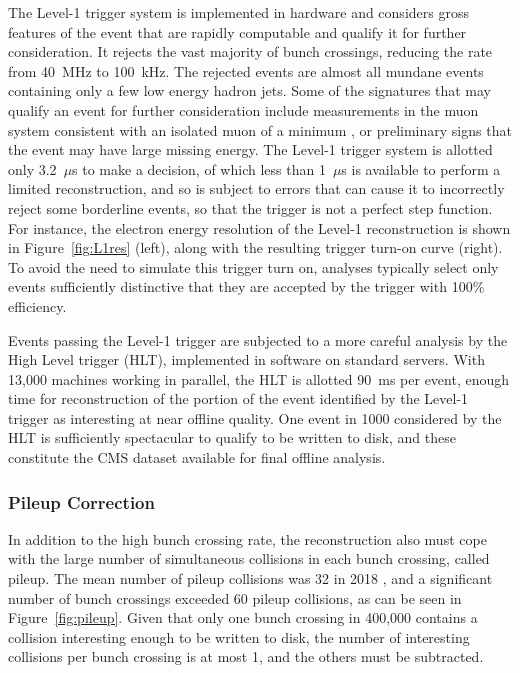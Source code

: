     The Level-1 trigger system is implemented in hardware and considers gross features of the event that are rapidly computable and qualify it for further consideration.
    It rejects the vast majority of bunch crossings, reducing the rate from 40~MHz to 100~kHz.
    The rejected events are almost all mundane events containing only a few low energy hadron jets.
    Some of the signatures that may qualify an event for further consideration include measurements in the muon system consistent with an isolated muon of a minimum \pt, or preliminary signs that the event may have large missing energy.
    The Level-1 trigger system is allotted only 3.2~$\mu$s to make a decision, of which less than 1~$\mu$s is available to perform a limited reconstruction, and so is subject to errors that can cause it to incorrectly reject some borderline events, so that the trigger is not a perfect step function.
    For instance, the electron energy resolution of the Level-1 reconstruction is shown in Figure~\ref{fig:L1res} (left), along with the resulting trigger turn-on curve (right).
    To avoid the need to simulate this trigger turn on, analyses typically select only events sufficiently distinctive that they are accepted by the trigger with 100\% efficiency.

    Events passing the Level-1 trigger are subjected to a more careful analysis by the High Level trigger (HLT), implemented in software on standard servers.
    With 13,000 machines working in parallel, the HLT is allotted 90~ms per event, enough time for reconstruction of the portion of the event identified by the Level-1 trigger as interesting at near offline quality.
    One event in 1000 considered by the HLT is sufficiently spectacular to qualify to be written to disk, and these constitute the CMS dataset available for final offline analysis.

    \subsubsection{Pileup Correction} \label{sec:pileup}

    In addition to the high bunch crossing rate, the reconstruction also must cope with the large number of simultaneous collisions in each bunch crossing, called pileup.
    The mean number of pileup collisions was 32 in 2018 \cite{lumipublic}, and a significant number of bunch crossings exceeded 60 pileup collisions, as can be seen in Figure~\ref{fig:pileup}.
    Given that only one bunch crossing in 400,000 contains a collision interesting enough to be written to disk, the number of interesting collisions per bunch crossing is at most 1, and the others must be subtracted.

